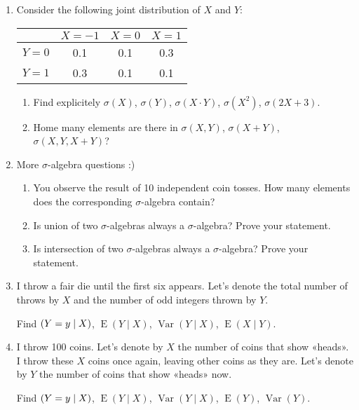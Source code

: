 \documentclass[12pt]{article}
\DeclareMathOperator{\Var}{Var}
\DeclareMathOperator{\E}{E}
\let\P\relax
\DeclareMathOperator{\P}{\mathbb{P}}
\begin{document}
\begin{enumerate}

\item 
  Consider the following joint distribution of $X$ and $Y$:

  \begin{tabular}{*{4}{c}}
  \toprule
  & $X=-1$ & $X=0$ & $X=1$ \\
  \midrule
  $Y=0$ & 0.1 & 0.1 & 0.3  \\
  $Y=1$ & 0.3 & 0.1 & 0.1  \\
  \bottomrule
  \end{tabular}
  
  \begin{enumerate}
   \item Find explicitely $\sigma(X)$, $\sigma(Y)$, $\sigma(X \cdot Y)$, $\sigma(X^2)$, $\sigma(2X+3)$.
   \item Home many elements are there in $\sigma(X, Y)$, $\sigma(X + Y)$, $\sigma(X, Y, X+Y)$?
  \end{enumerate}
  

\item More $\sigma$-algebra questions :)
\begin{enumerate}
  \item You observe the result of 10 independent coin tosses. How many elements does the corresponding $\sigma$-algebra contain?
  \item Is union of two $\sigma$-algebras always a $\sigma$-algebra? Prove your statement.
  \item Is intersection of two $\sigma$-algebras always a $\sigma$-algebra? Prove your statement.
\end{enumerate}

\item I throw a fair die until the first six appears. 
Let's denote the total number of throws by $X$ and the number of odd integers thrown by $Y$.

Find $\P(Y=y \mid X)$, $\E(Y \mid X)$, $\Var(Y \mid X)$, $\E(X \mid Y)$.

\item I throw 100 coins. Let's denote by $X$ the number of coins that show «heads».
I throw these $X$ coins once again, leaving other coins as they are. 
Let's denote by $Y$ the number of coins that show «heads» now.

Find $\P(Y=y \mid X)$, $\E(Y \mid X)$, $\Var(Y \mid X)$, $\E(Y)$, $\Var(Y)$.



\end{enumerate}
\end{document}
